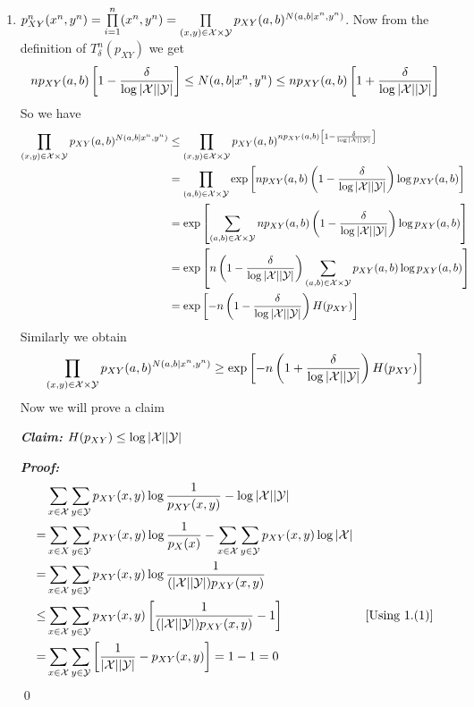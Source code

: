 \documentclass[a4paper, 11pt]{article}
\begin{document}
{\begin{enumerate}
		
		\item $p^n_{XY}(x^n,y^n)=\prod\limits_{i=1}^n(x^n,y^n)=\prod\limits_{(x,y)\in \mathcal{X}\times \mathcal{Y}}p_{XY}(a,b)^{N(a,b|x^n,y^n)}$. Now from the definition of $T_{\delta}^n(p_{XY})$ we get $$np_{XY}(a,b)\left[ 1-\frac{\delta }{\log |\mathcal{X}||\mathcal{Y}|} \right]\leq N(a,b|x^n,y^n)\leq np_{XY}(a,b)\left[ 1+\frac{\delta }{\log |\mathcal{X}||\mathcal{Y}|} \right]$$
		So we have \begin{align*}
			\prod\limits_{(x,y)\in \mathcal{X}\times \mathcal{Y}}p_{XY}(a,b)^{N(a,b|x^n,y^n)} & \leq  \prod\limits_{(x,y)\in \mathcal{X}\times \mathcal{Y}}p_{XY}(a,b)^{np_{XY}(a,b)\left[ 1-\frac{\delta}{\log |\mathcal{X}||\mathcal{Y}|} \right]}      \\
			                                                                    & =\prod_{(a,b)\in\mathcal{X}\times \mathcal{Y}}\exp\left[ np_{XY}(a,b)\left( 1-\frac{\delta}{\log |\mathcal{X}||\mathcal{Y}|} \right) \log p_{XY}(a,b)  \right] \\
			                                                                    & =\exp\left[\sum_{(a,b)\in\mathcal{X}\times \mathcal{Y}} np_{XY}(a,b)\left( 1-\frac{\delta}{\log |\mathcal{X}||\mathcal{Y}|} \right) \log p_{XY}(a,b)  \right]  \\
			                                                                    & =\exp\left[n\left( 1-\frac{\delta}{\log |\mathcal{X}||\mathcal{Y}|} \right)\sum_{(a,b)\in\mathcal{X}\times \mathcal{Y}} p_{XY}(a,b) \log p_{XY}(a,b)  \right]  \\
			                                                                    & =\exp\left[-n\left( 1-\frac{\delta}{\log |\mathcal{X}||\mathcal{Y}|} \right) H(p_{XY})\right]
		\end{align*}
		Similarly we obtain $$	\prod\limits_{(x,y)\in \mathcal{X}\times \mathcal{Y}}p_{XY}(a,b)^{N(a,b|x^n,y^n)}\geq \exp\left[-n\left( 1+\frac{\delta}{\log |\mathcal{X}||\mathcal{Y}|} \right) H(p_{XY})\right]$$Now we will prove a claim
		
		\textbf{\textit{Claim:}} $H(p_{XY})\leq \log |\mathcal{X}||\mathcal{Y}|$
		
		\textbf{\textit{Proof:}} \begin{align*}
			     & \sum_{x\in \mathcal{X}}\sum_{y\in \mathcal{Y}}p_{XY}(x,y)\log \frac1{p_{XY}(x,y)}-\log |\mathcal{X}||\mathcal{Y}|                             &                      \\
			=    & \sum_{x\in X}\sum_{y\in \mathcal{Y}}p_{XY}(x,y)\log \frac1{p_X(x)}-\sum_{x\in \mathcal{X}}\sum_{y\in \mathcal{Y}}p_{XY}(x,y)\log|\mathcal{X}| &                      \\
			=    & \sum_{x\in \mathcal{X}}\sum_{y\in \mathcal{Y}}p_{XY}(x,y)\log \frac{1}{(|\mathcal{X}||\mathcal{Y}|)p_{XY}(x,y)}                               &                      \\
			\leq & \sum_{x\in \mathcal{X}}\sum_{y\in \mathcal{Y}} p_{XY}(x,y)\left[ \frac1{(|\mathcal{X}||\mathcal{Y}|)p_{XY}(x,y)}-1 \right]                         & [\text{Using 1.(1)}] \\
			=    & \sum_{x\in \mathcal{X}}\sum_{y\in \mathcal{Y}}\left[  \frac{1}{|\mathcal{X}||\mathcal{Y}|}-p_{XY}(x,y)\right] =1-1=0                               &
		\end{align*}\qed
		

\end{enumerate}}
\end{document}

